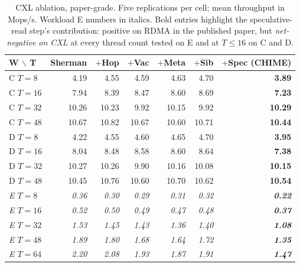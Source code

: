 \documentclass[11pt,a4paper]{article}
\begin{document}
\begin{table}[H]
\centering
\small
\caption{CXL ablation, paper-grade. Five replications per cell; mean throughput in Mops/s. Workload E numbers in italics. Bold entries highlight the speculative-read step's contribution: positive on RDMA in the published paper, but \emph{net-negative on CXL} at every thread count tested on E and at $T \le 16$ on C and D.}
\label{tab:cxl-ablation-comprehensive}
\begin{tabular}{@{}lrrrrrr@{}}
\toprule
W $\backslash$ T & Sherman & $+$Hop & $+$Vac & $+$Meta & $+$Sib & \textbf{$+$Spec (CHIME)} \\
\midrule
C $T=8$  & 4.19 & 4.55 & 4.59 & 4.63 & 4.70 & \textbf{3.89} \\
C $T=16$ & 7.94 & 8.39 & 8.47 & 8.60 & 8.69 & \textbf{7.23} \\
C $T=32$ & 10.26 & 10.23 & 9.92 & 10.15 & 9.92 & \textbf{10.29} \\
C $T=48$ & 10.67 & 10.82 & 10.67 & 10.60 & 10.71 & \textbf{10.44} \\
\midrule
D $T=8$  & 4.22 & 4.55 & 4.60 & 4.65 & 4.70 & \textbf{3.95} \\
D $T=16$ & 8.04 & 8.48 & 8.58 & 8.60 & 8.64 & \textbf{7.38} \\
D $T=32$ & 10.27 & 10.26 & 9.90 & 10.16 & 10.08 & \textbf{10.15} \\
D $T=48$ & 10.45 & 10.76 & 10.60 & 10.70 & 10.62 & \textbf{10.54} \\
\midrule
\textit{E $T=8$}  & \textit{0.36} & \textit{0.30} & \textit{0.29} & \textit{0.31} & \textit{0.32} & \textbf{\textit{0.22}} \\
\textit{E $T=16$} & \textit{0.52} & \textit{0.50} & \textit{0.49} & \textit{0.47} & \textit{0.48} & \textbf{\textit{0.37}} \\
\textit{E $T=32$} & \textit{1.53} & \textit{1.45} & \textit{1.43} & \textit{1.36} & \textit{1.40} & \textbf{\textit{1.08}} \\
\textit{E $T=48$} & \textit{1.89} & \textit{1.80} & \textit{1.68} & \textit{1.64} & \textit{1.72} & \textbf{\textit{1.35}} \\
\textit{E $T=64$} & \textit{2.20} & \textit{2.08} & \textit{1.93} & \textit{1.87} & \textit{1.91} & \textbf{\textit{1.47}} \\
\bottomrule
\end{tabular}
\end{table}
\end{document}
